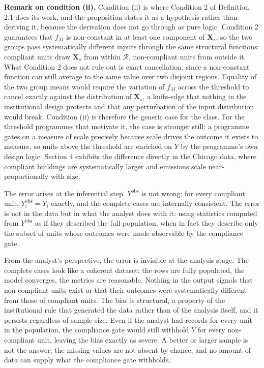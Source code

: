 \textbf{Remark on condition (ii).} Condition (ii) is where Condition 2 of Definition 2.1 does its work, and the proposition states it as a hypothesis rather than deriving it, because the derivation does not go through as pure logic. Condition 2 guarantees that $f_M$ is non-constant in at least one component of $\mathbf{X}_s$, so the two groups pass systematically different inputs through the same structural functions: compliant units draw $\mathbf{X}_s$ from within $\mathcal{R}$, non-compliant units from outside it. What Condition 2 does not rule out is exact cancellation, since a non-constant function can still average to the same value over two disjoint regions. Equality of the two group means would require the variation of $f_M$ across the threshold to cancel exactly against the distribution of $\mathbf{X}_s$, a knife-edge that nothing in the institutional design protects and that any perturbation of the input distribution would break. Condition (ii) is therefore the generic case for the class. For the threshold programmes that motivate it, the case is stronger still: a programme gates on a measure of scale precisely because scale drives the outcome it exists to measure, so units above the threshold are enriched on $Y$ by the programme's own design logic. Section 4 exhibits the difference directly in the Chicago data, where compliant buildings are systematically larger and emissions scale near-proportionally with size.

The error arises at the inferential step. $Y^{\text{obs}}$ is not wrong: for every compliant unit, $Y_i^{\text{obs}} = Y_i$ exactly, and the complete cases are internally consistent. The error is not in the data but in what the analyst does with it: using statistics computed from $Y^{\text{obs}}$ as if they described the full population, when in fact they describe only the subset of units whose outcomes were made observable by the compliance gate.

From the analyst's perspective, the error is invisible at the analysis stage. The complete cases look like a coherent dataset: the rows are fully populated, the model converges, the metrics are reasonable. Nothing in the output signals that non-compliant units exist or that their outcomes were systematically different from those of compliant units. The bias is structural, a property of the institutional rule that generated the data rather than of the analysis itself, and it persists regardless of sample size. Even if the analyst had records for every unit in the population, the compliance gate would still withhold $Y$ for every non-compliant unit, leaving the bias exactly as severe. A better or larger sample is not the answer; the missing values are not absent by chance, and no amount of data can supply what the compliance gate withholds.

